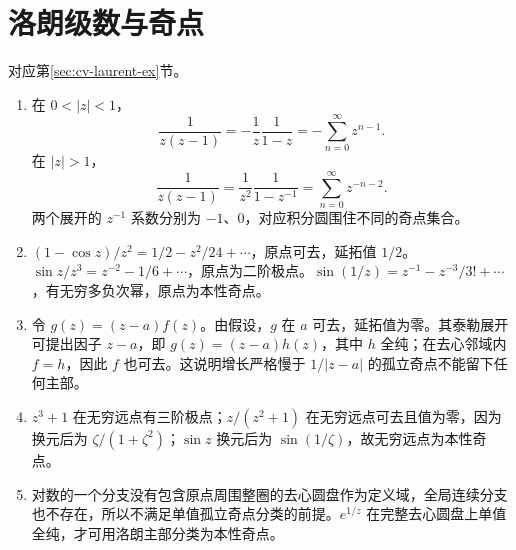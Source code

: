 \documentclass[UTF8,12pt,a4paper,fontset=fandol]{ctexbook}
\begin{document}
\section{洛朗级数与奇点}
对应第\ref{sec:cv-laurent-ex}节。
\begin{enumerate}
 \item 在 $0<|z|<1$，
 \[
 \frac1{z(z-1)}=-\frac1z\frac1{1-z}=-\sum_{n=0}^\infty z^{n-1}.
 \]
 在 $|z|>1$，
 \[
 \frac1{z(z-1)}=\frac1{z^2}\frac1{1-z^{-1}}
 =\sum_{n=0}^\infty z^{-n-2}.
 \]
 两个展开的 $z^{-1}$ 系数分别为 $-1$、$0$，对应积分圆围住不同的奇点集合。
 \item $(1-\cos z)/z^2=1/2-z^2/24+\cdots$，原点可去，延拓值 $1/2$。$\sin z/z^3=z^{-2}-1/6+\cdots$，原点为二阶极点。$\sin(1/z)=z^{-1}-z^{-3}/3!+\cdots$，有无穷多负次幂，原点为本性奇点。
 \item 令 $g(z)=(z-a)f(z)$。由假设，$g$ 在 $a$ 可去，延拓值为零。其泰勒展开可提出因子 $z-a$，即 $g(z)=(z-a)h(z)$，其中 $h$ 全纯；在去心邻域内 $f=h$，因此 $f$ 也可去。这说明增长严格慢于 $1/|z-a|$ 的孤立奇点不能留下任何主部。
 \item $z^3+1$ 在无穷远点有三阶极点；$z/(z^2+1)$ 在无穷远点可去且值为零，因为换元后为 $\zeta/(1+\zeta^2)$；$\sin z$ 换元后为 $\sin(1/\zeta)$，故无穷远点为本性奇点。
 \item 对数的一个分支没有包含原点周围整圈的去心圆盘作为定义域，全局连续分支也不存在，所以不满足单值孤立奇点分类的前提。$e^{1/z}$ 在完整去心圆盘上单值全纯，才可用洛朗主部分类为本性奇点。
\end{enumerate}
\end{document}
